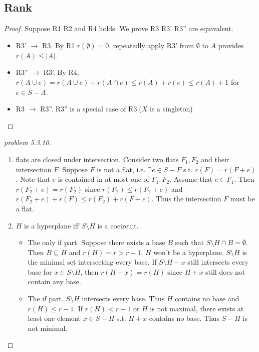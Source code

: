 \documentclass[12pt]{article}
\begin{document}
\subsection{Rank}
\begin{proof}
    Suppose R1 R2 and R4 holds. We prove R3 R3' R3'' are equivalent.
    \begin{itemize}
        \item R3' $\to$ R3. By R1 $r(\emptyset)=0$, repeatedly apply R3' from $\emptyset$ to $A$ provides $r(A)\leq |A|$.
        \item R3'' $\to$ R3'. By R4, $r(A\cup e)=r(A\cup e)+r(A\cap e)\leq r(A)+r(e)\leq r(A)+1$ for $e\in S-A$.
        \item R3 $\to$ R3''. R3'' is a special case of R3.($X$ is a singleton)
    \end{itemize}
\end{proof}
\begin{proof}[problem 5.3.10]
    \begin{enumerate}
        \item flats are closed under intersection. Consider two flats $F_1,F_2$ and their intersection $F$. Suppose $F$ is not a flat, i.e. $\exists e\in S-F$ s.t. $r(F)=r(F+e)$. Note that $e$ is contained in at most one of $F_1,F_2$. Assume that $e\in F_1$. Then $r(F_2+e)=r(F_2)$ since $r(F_2)\leq r(F_2+e)$ and $r(F_2+e)+r(F)\leq r(F_2)+r(F+e)$. Thus the intersection $F$ must be a flat.
        \item $H$ is a hyperplane iff $S\setminus H$ is a cocircuit.
        \begin{itemize}
            \item The only if part. Suppose there exists a base $B$ such that $S\setminus H\cap B=\emptyset$. Then $B\subseteq H$ and $r(H)=r>r-1$. $H$ won't be a hyperplane. $S\setminus H$ is the minimal set intersecting every base. If $S\setminus H -x$ still intersects every base for $x\in S\setminus H$, then $r(H+x)=r(H)$ since $H+x$ still does not contain any base.
            \item The if part. $S\setminus H$ intersects every base. Thus $H$ contains no base and $r(H)\leq r-1$. If $r(H)<r-1$ or $H$ is not maximal, there exists at least one element $x\in S-H$ s.t. $H+x$ contains no base. Thus $S-H$ is not minimal.
        \end{itemize}
    \end{enumerate}
\end{proof}
\end{document}
